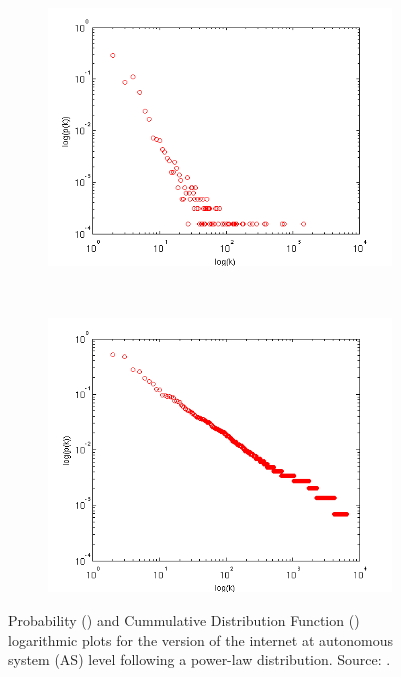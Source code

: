 \documentclass[10pt,a4paper]{article}
\theoremstyle{plain}
\theoremstyle{definition}
\begin{document}
\begin{figure}[H]
	\centering
	\begin{subfigure}[b]{0.38\textwidth}
		\includegraphics[width=\textwidth]{images/noisyplot.png}
		\caption{}
		\label{noisy}
	\end{subfigure}
	~ 
	\begin{subfigure}[b]{0.38\textwidth}
		\includegraphics[width=\textwidth]{images/cfdplot.png}
		\caption{}
		\label{cdf}
	\end{subfigure}
	\caption{ Probability () and Cummulative Distribution Function () logarithmic plots for the version of the internet at autonomous system (AS) level following a power-law distribution.  Source: \cite{frankthesis}. }
	\label{log-plots}
\end{figure}
\end{document}
